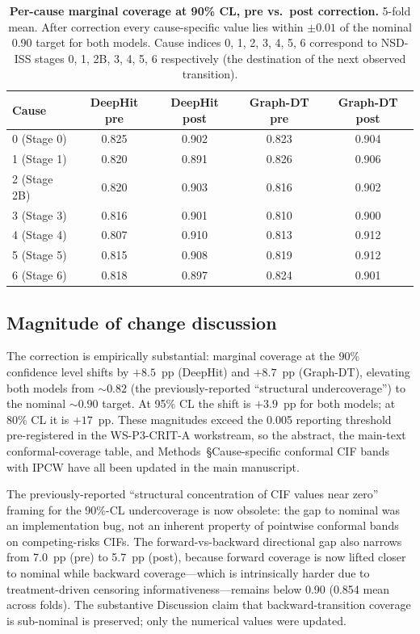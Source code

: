 \documentclass[11pt]{article}
\begin{document}
\begin{table}[h!]
\centering
\caption{\textbf{Per-cause marginal coverage at 90\% CL, pre vs.\ post correction.} 5-fold mean. After correction every cause-specific value lies within $\pm 0.01$ of the nominal 0.90 target for both models. Cause indices 0, 1, 2, 3, 4, 5, 6 correspond to NSD-ISS stages 0, 1, 2B, 3, 4, 5, 6 respectively (the destination of the next observed transition).}
\label{tab:scrita_per_cause}
\begin{tabular}{lcccc}
\toprule
\textbf{Cause} & \textbf{DeepHit pre} & \textbf{DeepHit post} & \textbf{Graph-DT pre} & \textbf{Graph-DT post} \\
\midrule
0 (Stage 0) & 0.825 & 0.902 & 0.823 & 0.904 \\
1 (Stage 1) & 0.820 & 0.891 & 0.826 & 0.906 \\
2 (Stage 2B) & 0.820 & 0.903 & 0.816 & 0.902 \\
3 (Stage 3) & 0.816 & 0.901 & 0.810 & 0.900 \\
4 (Stage 4) & 0.807 & 0.910 & 0.813 & 0.912 \\
5 (Stage 5) & 0.815 & 0.908 & 0.819 & 0.912 \\
6 (Stage 6) & 0.818 & 0.897 & 0.824 & 0.901 \\
\bottomrule
\end{tabular}
\end{table}

\subsection*{Magnitude of change discussion}

The correction is empirically substantial: marginal coverage at the 90\% confidence level shifts by $+8.5$~pp (DeepHit) and $+8.7$~pp (Graph-DT), elevating both models from $\sim 0.82$ (the previously-reported ``structural undercoverage'') to the nominal $\sim 0.90$ target. At 95\% CL the shift is $+3.9$~pp for both models; at 80\% CL it is $+17$~pp. These magnitudes exceed the 0.005 reporting threshold pre-registered in the WS-P3-CRIT-A workstream, so the abstract, the main-text conformal-coverage table, and Methods~\S Cause-specific conformal CIF bands with IPCW have all been updated in the main manuscript.

The previously-reported ``structural concentration of CIF values near zero'' framing for the 90\%-CL undercoverage is now obsolete: the gap to nominal was an implementation bug, not an inherent property of pointwise conformal bands on competing-risks CIFs. The forward-vs-backward directional gap also narrows from 7.0~pp (pre) to 5.7~pp (post), because forward coverage is now lifted closer to nominal while backward coverage---which is intrinsically harder due to treatment-driven censoring informativeness---remains below 0.90 (0.854 mean across folds). The substantive Discussion claim that backward-transition coverage is sub-nominal is preserved; only the numerical values were updated.
\end{document}
